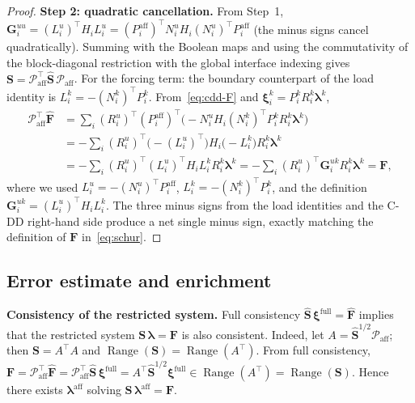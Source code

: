 \documentclass[11pt,a4paper]{article}
\newcommand{\trac}{\bm{\lambda}}
\newcommand{\DtN}{\mathbf{G}}
\newcommand{\Schur}{\mathbf{S}}
\newcommand{\Range}{\operatorname{Range}}
\begin{document}
\begin{proof}
  \textbf{Step 2: quadratic cancellation.}
  From Step~1,
  $\DtN_i^{uu} = (L_i^u)^\top H_i L_i^u
   = (P_i^{\text{aff}})^\top N_i^u H_i (N_i^u)^\top P_i^{\text{aff}}$
  (the minus signs cancel quadratically).
  Summing with the Boolean maps and using the commutativity of the
  block-diagonal restriction with the global interface indexing gives
  $\Schur = \mathcal{P}_{\text{aff}}^\top \widehat{\Schur}\,
   \mathcal{P}_{\text{aff}}$.
  For the forcing term: the boundary counterpart of the load identity is
  $L_i^k = -(N_i^k)^\top P_i^k$.
  From~\eqref{eq:cdd-F} and $\bm{\xi}_i^k = P_i^k R_i^k
  \trac^k$,
  \begin{align*}
    \mathcal{P}_{\text{aff}}^\top \widehat{\bm{F}}
    &= \sum_i (R_i^u)^\top (P_i^{\text{aff}})^\top
       \bigl(-N_i^u H_i (N_i^k)^\top P_i^k
       R_i^k \trac^k\bigr) \\
    &= -\sum_i (R_i^u)^\top
       \bigl(-(L_i^u)^\top\bigr) H_i \bigl(-L_i^k\bigr)
       R_i^k \trac^k \\
    &= -\sum_i (R_i^u)^\top (L_i^u)^\top H_i L_i^k R_i^k \trac^k
     = -\sum_i (R_i^u)^\top \DtN_i^{uk} R_i^k \trac^k
     = \bm{F},
  \end{align*}
  where we used $L_i^u = -(N_i^u)^\top P_i^{\text{aff}}$,
  $L_i^k = -(N_i^k)^\top P_i^k$, and the definition
  $\DtN_i^{uk} = (L_i^u)^\top H_i L_i^k$.
  The three minus signs from the load identities and the C-DD right-hand
  side produce a net single minus sign, exactly matching the definition
  of $\bm{F}$ in~\eqref{eq:schur}.
\end{proof}

\subsection{Error estimate and enrichment}

\textbf{Consistency of the restricted system.}
  Full consistency $\widehat{\Schur}\,\bm{\xi}^{\text{full}}
  = \widehat{\bm{F}}$ implies that the restricted system
  $\Schur\,\trac = \bm{F}$ is also consistent.
  Indeed, let $A = \widehat{\Schur}^{1/2}\mathcal{P}_{\text{aff}}$;
  then $\Schur = A^\top A$ and $\Range(\Schur) = \Range(A^\top)$.
  From full consistency,
  $\bm{F} = \mathcal{P}_{\text{aff}}^\top \widehat{\bm{F}}
   = \mathcal{P}_{\text{aff}}^\top \widehat{\Schur}\,
     \bm{\xi}^{\text{full}}
   = A^\top \widehat{\Schur}^{1/2}\bm{\xi}^{\text{full}}
   \in \Range(A^\top) = \Range(\Schur)$.
  Hence there exists $\trac^{\text{aff}}$ solving
  $\Schur\,\trac^{\text{aff}} = \bm{F}$.
\end{document}
